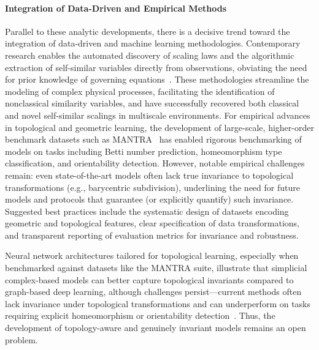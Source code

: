 \documentclass[sigconf]{acmart}
\begin{document}
\paragraph{Integration of Data-Driven and Empirical Methods} 
Parallel to these analytic developments, there is a decisive trend toward the integration of data-driven and machine learning methodologies. Contemporary research enables the automated discovery of scaling laws and the algorithmic extraction of self-similar variables directly from observations, obviating the need for prior knowledge of governing equations~\cite{ref30,ref65}. These methodologies streamline the modeling of complex physical processes, facilitating the identification of nonclassical similarity variables, and have successfully recovered both classical and novel self-similar scalings in multiscale environments. For empirical advances in topological and geometric learning, the development of large-scale, higher-order benchmark datasets such as MANTRA~\cite{ref26} has enabled rigorous benchmarking of models on tasks including Betti number prediction, homeomorphism type classification, and orientability detection. However, notable empirical challenges remain: even state-of-the-art models often lack true invariance to topological transformations (e.g., barycentric subdivision), underlining the need for future models and protocols that guarantee (or explicitly quantify) such invariance. Suggested best practices include the systematic design of datasets encoding geometric and topological features, clear specification of data transformations, and transparent reporting of evaluation metrics for invariance and robustness.

Neural network architectures tailored for topological learning, especially when benchmarked against datasets like the MANTRA suite, illustrate that simplicial complex-based models can better capture topological invariants compared to graph-based deep learning, although challenges persist—current methods often lack invariance under topological transformations and can underperform on tasks requiring explicit homeomorphism or orientability detection~\cite{ref26}. Thus, the development of topology-aware and genuinely invariant models remains an open problem.
\end{document}
